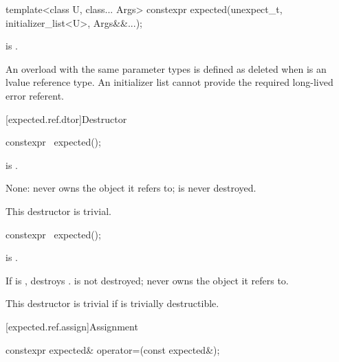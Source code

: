 %
\begin{itemdecl}
template<class U, class... Args>
constexpr expected(unexpect_t, initializer_list<U>, Args&&...);
\end{itemdecl}

\begin{itemdescr}
\pnum
\constraints
{} is .

\pnum
\remarks
An overload with the same parameter types is defined as deleted when  is an lvalue reference type. An initializer list cannot provide the required long-lived error referent.
\end{itemdescr}

[expected.ref.dtor]{Destructor}

%
\begin{itemdecl}
constexpr ~expected();
\end{itemdecl}

\begin{itemdescr}
\pnum
\constraints
{} is .

\pnum
\effects
None:  never owns the object it refers to;  is never destroyed.

\pnum
\remarks
This destructor is trivial.
\end{itemdescr}

%
\begin{itemdecl}
constexpr ~expected();
\end{itemdecl}

\begin{itemdescr}
\pnum
\constraints
{} is .

\pnum
\effects
If  is , destroys .  is not destroyed;  never owns the object it refers to.

\pnum
\remarks
This destructor is trivial if  is trivially destructible.
\end{itemdescr}

[expected.ref.assign]{Assignment}

%
\begin{itemdecl}
constexpr expected& operator=(const expected&);
\end{itemdecl}

